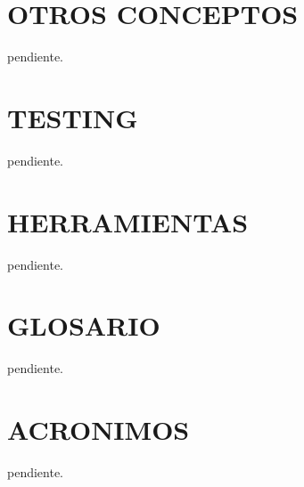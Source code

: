 \documentclass[letterpaper,12pt]{report}
\begin{document}
\appendix

\chapter{OTROS CONCEPTOS}
pendiente.

\chapter{TESTING}
pendiente.

\chapter{HERRAMIENTAS}
pendiente.

\chapter{GLOSARIO}
pendiente.

\chapter{ACRONIMOS}
pendiente.

\end{document}
